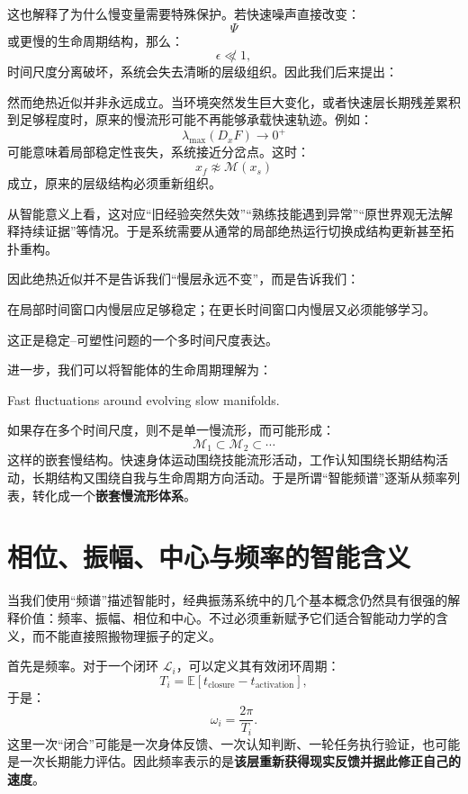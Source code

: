 这也解释了为什么慢变量需要特殊保护。若快速噪声直接改变：
\[
\Psi
\]
或更慢的生命周期结构，那么：
\[
\epsilon
\not\ll
1,
\]
时间尺度分离破坏，系统会失去清晰的层级组织。因此我们后来提出：
\begin{statementbox}
\centering
{}
\end{statementbox}

然而绝热近似并非永远成立。当环境突然发生巨大变化，或者快速层长期残差累积到足够程度时，原来的慢流形可能不再能够承载快速轨迹。例如：
\[
\lambda_{\max}
\left(
D_xF
\right)
\rightarrow
0^+
\]
可能意味着局部稳定性丧失，系统接近分岔点。这时：
\[
x_f
\not\approx
\mathcal{M}(x_s)
\]
成立，原来的层级结构必须重新组织。

从智能意义上看，这对应“旧经验突然失效”“熟练技能遇到异常”“原世界观无法解释持续证据”等情况。于是系统需要从通常的局部绝热运行切换成结构更新甚至拓扑重构。

因此绝热近似并不是告诉我们“慢层永远不变”，而是告诉我们：
\begin{statementbox}
在局部时间窗口内慢层应足够稳定；在更长时间窗口内慢层又必须能够学习。
\end{statementbox}
这正是稳定--可塑性问题的一个多时间尺度表达。

进一步，我们可以将智能体的生命周期理解为：
\begin{statementbox}
Fast fluctuations around evolving slow manifolds.
\end{statementbox}
如果存在多个时间尺度，则不是单一慢流形，而可能形成：
\[
\mathcal{M}_1
\subset
\mathcal{M}_2
\subset
\cdots
\]
这样的嵌套慢结构。快速身体运动围绕技能流形活动，工作认知围绕长期结构活动，长期结构又围绕自我与生命周期方向活动。于是所谓“智能频谱”逐渐从频率列表，转化成一个\textbf{嵌套慢流形体系}。

\section{相位、振幅、中心与频率的智能含义}

当我们使用“频谱”描述智能时，经典振荡系统中的几个基本概念仍然具有很强的解释价值：频率、振幅、相位和中心。不过必须重新赋予它们适合智能动力学的含义，而不能直接照搬物理振子的定义。

首先是频率。对于一个闭环 $\mathcal{L}_i$，可以定义其有效闭环周期：
\[
T_i
=
\mathbb{E}
[
t_{\mathrm{closure}}
-t_{\mathrm{activation}}
],
\]
于是：
\[
\omega_i
=
\frac{2\pi}{T_i}.
\]
这里一次“闭合”可能是一次身体反馈、一次认知判断、一轮任务执行验证，也可能是一次长期能力评估。因此频率表示的是\textbf{该层重新获得现实反馈并据此修正自己的速度}。


